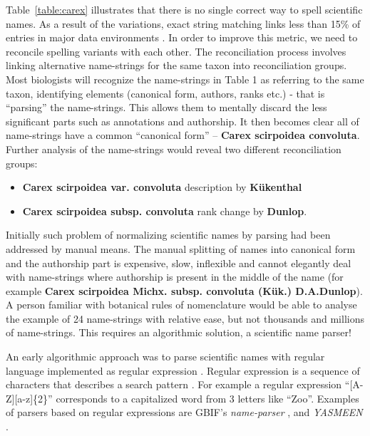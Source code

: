 \documentclass{bmcart}
\begin{document}
Table~\ref{table:carex} illustrates that there is no single correct way to
spell scientific names. As a result of the variations, exact string matching
links less than 15\% of entries in major data environments
\cite{Patterson:inpress-a}. In order to improve this metric, we need to
reconcile spelling variants with each other. The reconciliation process
involves linking alternative name-strings for the same taxon into
reconciliation groups. Most biologists will recognize the name-strings in Table
1 as referring to the same taxon, identifying elements (canonical form,
authors, ranks etc.) - that is ``parsing'' the name-strings.  This allows them
to mentally discard the less significant parts such as annotations and
authorship. It then becomes clear all of name-strings have a common ``canonical
form'' -- \textbf{Carex scirpoidea convoluta}. Further analysis of the
name-strings would reveal two different reconciliation groups:

\begin{itemize}

  \item \textbf{Carex scirpoidea var. convoluta} description by
    \textbf{Kükenthal}

  \item \textbf{Carex scirpoidea subsp. convoluta} rank change by
    \textbf{Dunlop}.

\end{itemize}

Initially such problem of normalizing scientific names by parsing had been
addressed by manual means. The manual splitting of names into canonical form
and the authorship part is expensive, slow, inflexible and cannot elegantly
deal with name-strings where authorship is present in the middle of the name
(for example \textbf{Carex scirpoidea Michx. subsp.  convoluta (Kük.)
D.A.Dunlop}). A person familiar with botanical rules of nomenclature would be
able to analyse the example of 24 name-strings with relative ease, but not
thousands and millions of name-strings. This requires an algorithmic solution,
a scientific name parser!

An early algorithmic approach was to parse scientific names with regular
language implemented as regular expression \cite{Leary2007}. Regular expression
is a sequence of characters that describes a search pattern
\cite{aho1992foundations}.   For example a regular expression ``[A-Z][a-z]\{2\}'' corresponds
to a capitalized word from 3 letters like ``Zoo''. Examples of parsers based on
regular expressions are GBIF's \textit{name-parser} \cite{gbifNameParser}, and
\textit{YASMEEN} \cite{VandenBerghe2015}.
\end{document}
